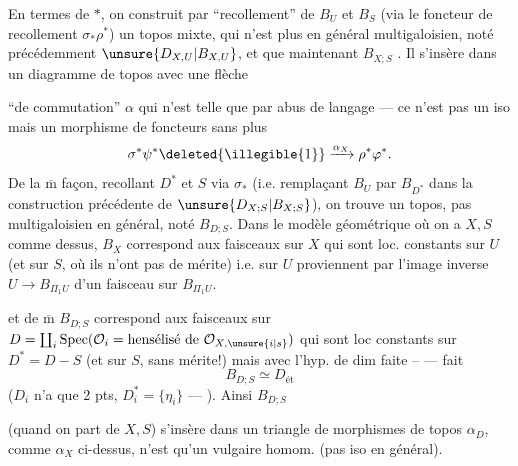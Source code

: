 En termes de $*$, on construit par ``recollement'' de $B_U$ et  $B_S$ (via le foncteur de recollement $\sigma_*\rho^*$) un topos mixte, qui n'est plus en général multigaloisien, noté précédemment $\unsure{D_{X,U}|B_{X,U}}$, et que  maintenant   $B_{X;S}$   . Il s'insère dans un diagramme de topos
avec une flèche


``de commutation'' $\alpha$ qui n'est telle que par abus de langage --- ce n'est pas un iso  mais un morphisme de foncteurs sans plus
\[
 \sigma^*\psi^*\deleted{\illegible{1}}\xrightarrow{\alpha_X}\rho^*\varphi^*.
\]
De la $\overline{\mathrm m}$ façon, recollant $D^*$ et $S$ via $\sigma_*$ (i.e. remplaçant $B_U$ par $B_{D^*}$ dans la construction précédente de $\unsure{D_{X;S}|B_{X;S}}$), on trouve un topos, pas multigaloisien en général, noté $B_{D;S}$. Dans le  modèle géométrique où on a $X,S$ comme dessus,
$B_X$ correspond aux faisceaux sur $X$ qui sont  loc. constants sur $U$ (et sur $S$, où ils n'ont pas de mérite) i.e. sur $U$ proviennent par l'image inverse   $U\longrightarrow B_{\Pi_1 U}$ d'un faisceau sur $B_{\Pi_1 U}$.

et de $\overline{\mathrm m}$ $B_{D;S}$ correspond aux faisceaux sur $D=\coprod_i\operatorname{Spec}(\mathcal O_i=\text{hensélisé de }\mathcal O_{X,\unsure{i|s}})$  qui sont loc constants sur $D^*=D-S$ (et sur $S$, sans mérite!) mais avec l'hyp. de dim faite -- ---  fait
\[
 B_{D;S}\simeq D_{\text{ét}}
\]
($D_i$ n'a que 2 pts, $D_i^*=\{\eta_i\}$ --- ). Ainsi $B_{D;S}$ 


(quand on part de $X,S$) s'insère dans un triangle de morphismes de topos
$\alpha_D$, comme $\alpha_X$ ci-dessus, n'est qu'un vulgaire homom. (pas iso en général).

